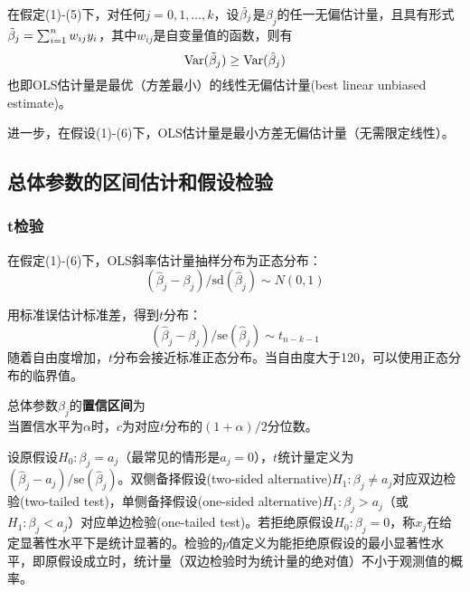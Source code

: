 \par 在假定(1)-(5)下，对任何$j=0,1,\dots,k$，设$\Tilde{\beta}_j$是$\beta_j$的任一无偏估计量，且具有形式$\Tilde{\beta}_j=\sum_{i=1}^n w_{ij}y_i$，其中$w_{ij}$是自变量值的函数，则有
\begin{equation}
    \text{Var}(\Tilde{\beta}_j)\ge \text{Var}(\hat{\beta}_j)
\end{equation}
也即OLS估计量是最优（方差最小）的线性无偏估计量(best linear unbiased estimate)。
\par 进一步，在假设(1)-(6)下，OLS估计量是最小方差无偏估计量（无需限定线性）。


\subsection{总体参数的区间估计和假设检验}

\subsubsection{t检验}
\par 在假定(1)-(6)下，OLS斜率估计量抽样分布为正态分布：
\begin{equation}
    (\hat{\beta}_j-\beta_j)/\text{sd}(\hat{\beta}_j) \sim N(0, 1)
\end{equation}
\par 用标准误估计标准差，得到$t$分布：
\begin{equation}
    (\hat{\beta}_j-\beta_j)/\text{se}(\hat{\beta}_j) \sim t_{n-k-1}
\end{equation}
随着自由度增加，$t$分布会接近标准正态分布。当自由度大于120，可以使用正态分布的临界值。

\par 总体参数$\beta_j$的\textbf{置信区间}为
\begin{equation}
    [\hat{\beta}_j-c\times \text{se}(\hat{\beta}_j),\hat{\beta}_j+c\times\text{se}(\hat{\beta}_j)]
\end{equation}
当置信水平为$\alpha$时，$c$为对应$t$分布的$(1+\alpha)/2$分位数。

\par 设原假设$H_0: \beta_j=a_j$（最常见的情形是$a_j=0$），$t$统计量定义为$(\hat{\beta}_j-a_j)/\text{se}(\hat{\beta}_j)$。双侧备择假设(two-sided alternative)$H_1: \beta_j\neq a_j$对应双边检验(two-tailed test)，单侧备择假设(one-sided alternative)$H_1: \beta_j > a_j$（或$H_1: \beta_j < a_j$）对应单边检验(one-tailed test)。若拒绝原假设$H_0: \beta_j=0$，称$x_j$在给定显著性水平下是统计显著的。检验的$p$值定义为能拒绝原假设的最小显著性水平，即原假设成立时，统计量（双边检验时为统计量的绝对值）不小于观测值的概率。

